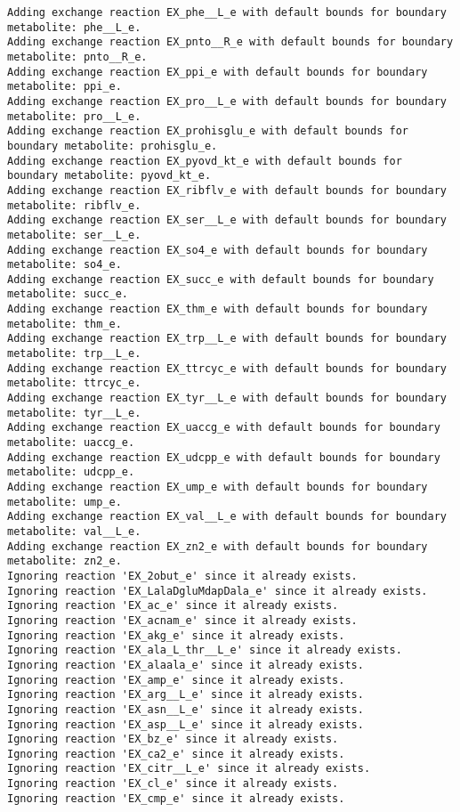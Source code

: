 \documentclass[
  letterpaper,
  DIV=11,
  numbers=noendperiod]{scrartcl}
\begin{document}
\begin{verbatim}
Adding exchange reaction EX_phe__L_e with default bounds for boundary metabolite: phe__L_e.
Adding exchange reaction EX_pnto__R_e with default bounds for boundary metabolite: pnto__R_e.
Adding exchange reaction EX_ppi_e with default bounds for boundary metabolite: ppi_e.
Adding exchange reaction EX_pro__L_e with default bounds for boundary metabolite: pro__L_e.
Adding exchange reaction EX_prohisglu_e with default bounds for boundary metabolite: prohisglu_e.
Adding exchange reaction EX_pyovd_kt_e with default bounds for boundary metabolite: pyovd_kt_e.
Adding exchange reaction EX_ribflv_e with default bounds for boundary metabolite: ribflv_e.
Adding exchange reaction EX_ser__L_e with default bounds for boundary metabolite: ser__L_e.
Adding exchange reaction EX_so4_e with default bounds for boundary metabolite: so4_e.
Adding exchange reaction EX_succ_e with default bounds for boundary metabolite: succ_e.
Adding exchange reaction EX_thm_e with default bounds for boundary metabolite: thm_e.
Adding exchange reaction EX_trp__L_e with default bounds for boundary metabolite: trp__L_e.
Adding exchange reaction EX_ttrcyc_e with default bounds for boundary metabolite: ttrcyc_e.
Adding exchange reaction EX_tyr__L_e with default bounds for boundary metabolite: tyr__L_e.
Adding exchange reaction EX_uaccg_e with default bounds for boundary metabolite: uaccg_e.
Adding exchange reaction EX_udcpp_e with default bounds for boundary metabolite: udcpp_e.
Adding exchange reaction EX_ump_e with default bounds for boundary metabolite: ump_e.
Adding exchange reaction EX_val__L_e with default bounds for boundary metabolite: val__L_e.
Adding exchange reaction EX_zn2_e with default bounds for boundary metabolite: zn2_e.
Ignoring reaction 'EX_2obut_e' since it already exists.
Ignoring reaction 'EX_LalaDgluMdapDala_e' since it already exists.
Ignoring reaction 'EX_ac_e' since it already exists.
Ignoring reaction 'EX_acnam_e' since it already exists.
Ignoring reaction 'EX_akg_e' since it already exists.
Ignoring reaction 'EX_ala_L_thr__L_e' since it already exists.
Ignoring reaction 'EX_alaala_e' since it already exists.
Ignoring reaction 'EX_amp_e' since it already exists.
Ignoring reaction 'EX_arg__L_e' since it already exists.
Ignoring reaction 'EX_asn__L_e' since it already exists.
Ignoring reaction 'EX_asp__L_e' since it already exists.
Ignoring reaction 'EX_bz_e' since it already exists.
Ignoring reaction 'EX_ca2_e' since it already exists.
Ignoring reaction 'EX_citr__L_e' since it already exists.
Ignoring reaction 'EX_cl_e' since it already exists.
Ignoring reaction 'EX_cmp_e' since it already exists.

\end{verbatim}
\end{document}
